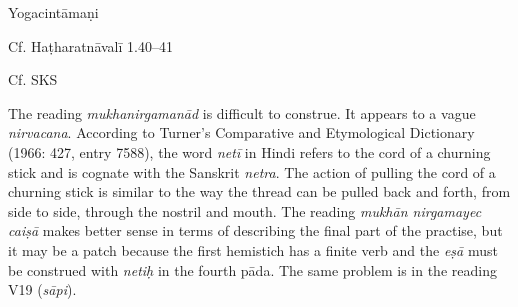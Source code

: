 \begin{ekdosis}
\begin{sources}[hp02_030]
\end{sources}

\begin{testimonia}[hp02_030]
Yogacintāmaṇi

\begin{versinnote}
\end{versinnote}

Cf. Haṭharatnāvalī 1.40–41

\begin{versinnote}
\end{versinnote}

Cf. SKS

\begin{versinnote}
\end{versinnote}
\end{testimonia}

\begin{philcomm}[hp02_030]
The reading \emph{mukhanirgamanād} is difficult to construe. It appears to a vague \emph{nirvacana}. According to Turner’s Comparative and Etymological Dictionary (1966: 427, entry 7588), the word \emph{netī} in Hindi refers to the cord of a churning stick and is cognate with the Sanskrit \emph{netra}. The action of pulling the cord of a churning stick is similar to the way the thread can be pulled back and forth, from side to side, through the nostril and mouth. The reading \emph{mukhān nirgamayec caiṣā} makes better sense in terms of describing the final part of the practise, but it may be a patch because the first hemistich has a finite verb and the \emph{eṣā} must be construed with \emph{netiḥ} in the fourth pāda. The same problem is in the reading V19 (\emph{sāpi}).
\end{philcomm}


\end{ekdosis}
